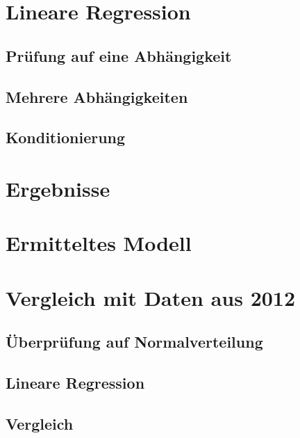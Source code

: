 \section{Lineare Regression}
\subsection{Prüfung auf eine Abhängigkeit}
\subsection{Mehrere Abhängigkeiten}
\subsection{Konditionierung}

\section{Ergebnisse}
\section{Ermitteltes Modell}

\section{Vergleich mit Daten aus 2012}
\subsection{Überprüfung auf Normalverteilung}
\subsection{Lineare Regression}
\subsection{Vergleich}

